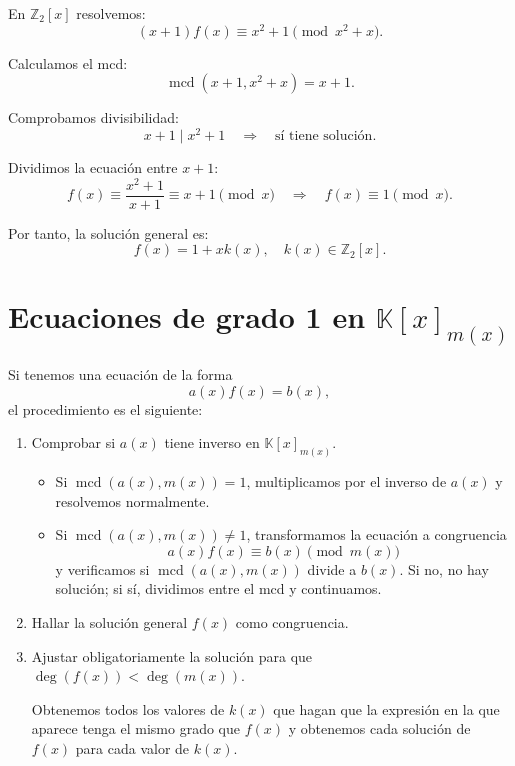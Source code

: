 \documentclass[a4paper,12pt]{article}
\begin{document}
\begin{ejemplo}[title=Ejemplo 2: Con solución]
En \(\mathbb{Z}_2[x]\) resolvemos:
\[
(x+1) f(x) \equiv x^2+1 \pmod{x^2+x}.
\]

Calculamos el mcd:
\[
\operatorname{mcd}(x+1, x^2+x) = x+1.
\]

Comprobamos divisibilidad:
\[
x+1 \mid x^2+1 \quad \Rightarrow \quad \text{sí tiene solución.}
\]

Dividimos la ecuación entre \(x+1\):
\[
f(x) \equiv \frac{x^2+1}{x+1} \equiv x+1 \pmod{x} \quad \Rightarrow \quad f(x) \equiv 1 \pmod{x}.
\]

Por tanto, la solución general es:
\[
f(x) = 1 + x k(x), \quad k(x) \in \mathbb{Z}_2[x].
\]
\end{ejemplo}

\section{Ecuaciones de grado 1 en \(\mathbb{K}[x]_{m(x)}\)}

\begin{procedimiento}[title=Resolución de ecuaciones de grado 1]
Si tenemos una ecuación de la forma
\[
a(x)f(x) = b(x),
\]
el procedimiento es el siguiente:

\begin{enumerate}
    \item Comprobar si \(a(x)\) tiene inverso en \(\mathbb{K}[x]_{m(x)}\).  
    \begin{itemize}
        \item Si \(\operatorname{mcd}(a(x), m(x)) = 1\), multiplicamos por el inverso de \(a(x)\) y resolvemos normalmente.
        \item Si \(\operatorname{mcd}(a(x), m(x)) \neq 1\), transformamos la ecuación a congruencia
        \[
        a(x) f(x) \equiv b(x) \pmod{m(x)}
        \]
        y verificamos si \(\operatorname{mcd}(a(x), m(x))\) divide a \(b(x)\). Si no, no hay solución; si sí, dividimos entre el mcd y continuamos.
    \end{itemize}
    \item Hallar la solución general \(f(x)\) como congruencia.  
    \item Ajustar obligatoriamente la solución para que \(\deg(f(x)) < \deg(m(x))\).
    
    Obtenemos todos los valores de \(k(x)\) que hagan que la expresión en la que aparece tenga el mismo grado que \(f(x)\) y obtenemos cada solución de \(f(x)\) para cada valor de \(k(x)\).
\end{enumerate}
\end{procedimiento}
\end{document}
